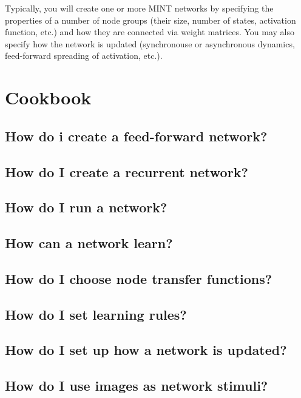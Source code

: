 \documentclass[12pt,letterpaper]{memoir}
\newcommand{\mint}{MINT\xspace}
\begin{document}
Typically, you will create one or more \mint networks by specifying
the properties of a number of node groups (their size, number of
states, activation function, etc.) and how they are connected via
weight matrices. You may also specify how the network is updated
(synchronouse or asynchronous dynamics, feed-forward spreading of
activation, etc.).


\chapter{Cookbook}
\label{chap:cookbook}

\section{How do i create a feed-forward network?}
\label{sec:feed-forward}


\section{How do I create a recurrent network?}
\label{sec:recurrent}

\section{How do I run a network?}
\label{sec:running-network}

\section{How can a network learn?}
\label{sec:learning}

\section{How do I choose node transfer functions?}
\label{sec:transfer-functions}

\section{How do I set learning rules?}
\label{sec:learning-rules}

\section{How do I set up how a network is updated?}
\label{sec:spreading}

\section{How do I use images as network stimuli?}
\label{sec:images}
\end{document}
